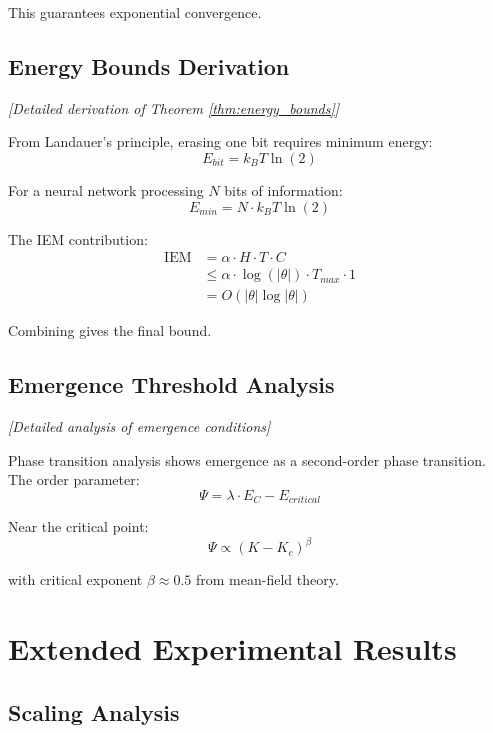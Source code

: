 \documentclass[12pt]{article}
\begin{document}
This guarantees exponential convergence.

\subsection{Energy Bounds Derivation}

\textit{[Detailed derivation of Theorem \ref{thm:energy_bounds}]}

From Landauer's principle, erasing one bit requires minimum energy:
\begin{equation}
E_{bit} = k_B T \ln(2)
\end{equation}

For a neural network processing $N$ bits of information:
\begin{equation}
E_{min} = N \cdot k_B T \ln(2)
\end{equation}

The IEM contribution:
\begin{align}
\text{IEM} &= \alpha \cdot H \cdot T \cdot C \\
&\leq \alpha \cdot \log(|\theta|) \cdot T_{max} \cdot 1 \\
&= O(|\theta| \log |\theta|)
\end{align}

Combining gives the final bound.

\subsection{Emergence Threshold Analysis}

\textit{[Detailed analysis of emergence conditions]}

Phase transition analysis shows emergence as a second-order phase transition. The order parameter:
\begin{equation}
\Psi = \lambda \cdot E_C - E_{critical}
\end{equation}

Near the critical point:
\begin{equation}
\Psi \propto (K - K_c)^{\beta}
\end{equation}

with critical exponent $\beta \approx 0.5$ from mean-field theory.

\section{Extended Experimental Results}

\subsection{Scaling Analysis}
\end{document}
